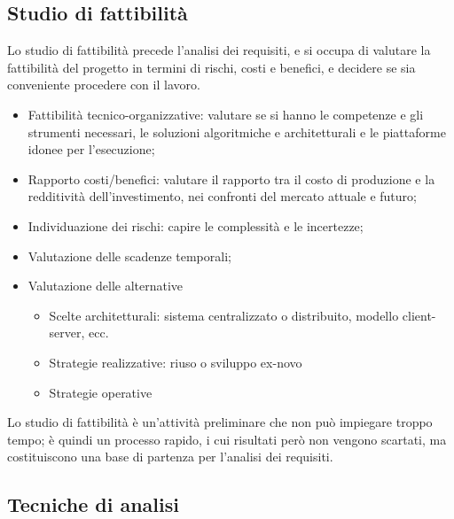 \subsection{Studio di fattibilità}

Lo studio di fattibilità precede l'analisi dei requisiti, e si occupa di
valutare la fattibilità del progetto in termini di rischi, costi e benefici, e
decidere se sia conveniente procedere con il lavoro.

\begin{itemize}
  \item Fattibilità tecnico-organizzative: valutare se si hanno le competenze e
        gli strumenti necessari, le soluzioni algoritmiche e architetturali e le
        piattaforme idonee per l'esecuzione;
  \item Rapporto costi/benefici: valutare il rapporto tra il costo di produzione
        e la redditività dell'investimento, nei confronti del mercato attuale e
        futuro;
  \item Individuazione dei rischi: capire le complessità e le incertezze;
  \item Valutazione delle scadenze temporali;
  \item Valutazione delle alternative

    \begin{itemize}
      \item Scelte architetturali: sistema centralizzato o distribuito, modello
            client-server, ecc.
      \item Strategie realizzative: riuso o sviluppo ex-novo
      \item Strategie operative
    \end{itemize}

\end{itemize}

Lo studio di fattibilità è un'attività preliminare che non può impiegare troppo
tempo; è quindi un processo rapido, i cui risultati però non vengono scartati,
ma costituiscono una base di partenza per l'analisi dei requisiti.

\subsection{Tecniche di analisi}

